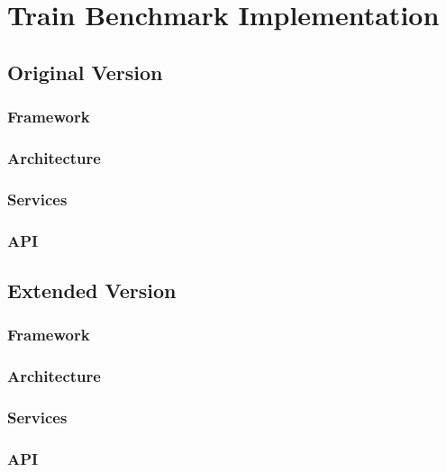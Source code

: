 \chapter{Train Benchmark Implementation}

\section{Original Version}
\subsection{Framework}
\subsection{Architecture}
\subsection{Services}
\subsection{API}

\section{Extended Version}
\subsection{Framework}
\subsection{Architecture}
\subsection{Services}
\subsection{API}

